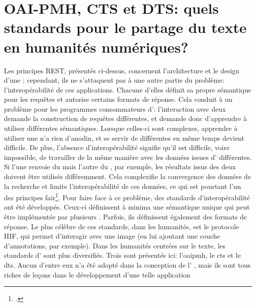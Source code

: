 \section{OAI-PMH, CTS et DTS: quels standards pour le partage du texte en humanités numériques?}
Les principes REST, présentés ci-dessus, concernent l'architecture et le design d'une \api{}; cependant, ils ne s'attaquent pas à une autre partie du problème: l'interopérabilité de ces applications. Chacune d'elles définit sa propre sémantique pour les requêtes et autorise certains formats de réponse. Cela conduit à un problème pour les programmes consommateurs d'\api{}: l'interaction avec deux \api{} demande la construction de requêtes différentes, et demande donc d'apprendre à utiliser différentes sémantiques. Lorsque celles-ci sont complexes, apprendre à utiliser une \api{} n'a rien d'anodin, et se servir de différentes \api{} en même temps devient difficile. De plus, l'absence d'interopérabilité signifie qu'il est difficile, voire impossible, de travailler de la même manière avec les données issues d'\api{} différentes. Si l'une renvoie du \json{} mais l'autre du \xml{}, par exemple, les résultats issus des deux \api{} doivent être utilisés différemment. Cela complexifie la convergence des données de la recherche et limite l'interopérabilité de ces données, ce qui est pourtant l'un des principes \gls{fair}\footcite[p. 932-933]{boeckhout_fair_2018}. Pour faire face à ce problème, des standards d'interopérabilité ont été développés. Ceux-ci définissent à minima une sémantique unique qui peut être implémentée par plusieurs \api{}. Parfois, ils définissent également des formats de réponse. Le plus célèbre de ces standards, dans les humanités, est le protocole IIIF, qui permet d'interagir avec une image (en lui ajoutant une couche d'annotations, par exemple). Dans les humanités centrées sur le texte, les standards d'\api{} sont plus diversifiés. Trois sont présentés ici: l'\gls{oaipmh}, le \gls{cts} et le \gls{dts}. Aucun d'entre eux n'a été adopté dans la conception de l'\api{} \ktb{}, mais ils sont tous riches de leçons dans le développement d'une telle application

